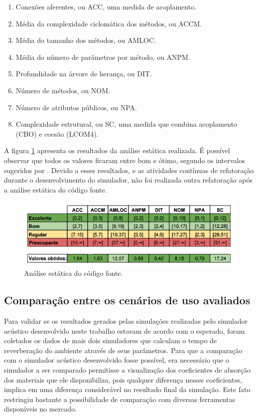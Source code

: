 \begin{enumerate}
\item Conexões aferentes, ou ACC, uma medida de acoplamento.
\item Média da complexidade ciclomática dos métodos, ou ACCM.
\item Média do tamanho dos métodos, ou AMLOC.
\item Média do número de parâmetros por método, ou ANPM.
\item Profundidade na árvore de herança, ou DIT.
\item Número de métodos, ou NOM.
\item Número de atributos públicos, ou NPA.
\item Complexidade estrutural, ou SC, uma medida que combina acoplamento (CBO) e coesão (LCOM4).
\end{enumerate}

A figura \ref{analise} apresenta os resultados da análise estática realizada. É possível observar que todos os valores ficaram entre bom e ótimo, segundo os intervalos sugeridos por . Devido a esses resultados, e as atividades contínuas de refatoração durante o desenvolvimento do simulador, não foi realizada outra refatoração após a análise estática do código fonte.

\begin{figure}[!htb]
\centering
\includegraphics[scale=0.6]{figuras/Analise_estatica}
\caption{Análise estática do código fonte.}
\label{analise}
\end{figure}

\subsection{Comparação entre os cenários de uso avaliados}

Para validar se os resultados gerados pelas simulações realizadas pelo simulador acústico desenvolvido neste trabalho estavam de acordo com o esperado, foram coletados os dados de mais dois simuladores que calculam o tempo de reverberação do ambiente através de seus parâmetros. Para que a comparação com o simulador acústico desenvolvido fosse possível, era necessário que o simulador a ser comparado permitisse a visualização dos coeficientes de absorção dos materiais que ele disponibiliza, pois qualquer diferença nesses coeficientes, implica em uma diferença considerável no resultado final da simulação. Este fato restringiu bastante a possibilidade de comparação com diversas ferramentas disponíveis no mercado.

